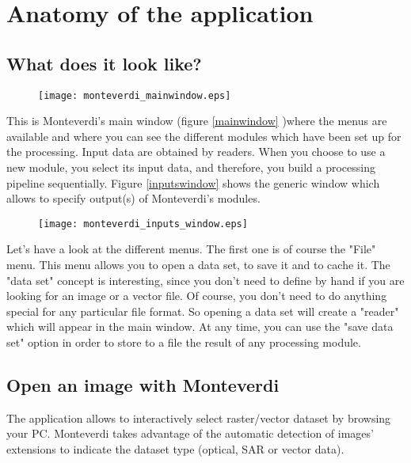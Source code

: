 \documentclass{InsightSoftwareGuide}
\begin{document}
 
\chapter{Anatomy of the application}
\section{What does it look like?}

\begin{figure}
   \center
   \texttt{[image: monteverdi\_mainwindow.eps]}
   \label{fig:mainwindow}
\end{figure}

This is Monteverdi's main window (figure \ref{mainwindow} )where the menus are available and where you can see the different 
modules which have been 
set up for the processing. Input data are obtained by readers. When you choose to use a new module, you select its input data,
 and therefore, you build a processing pipeline sequentially. 
Figure \ref{inputswindow} shows the generic window which allows to specify output(s) of Monteverdi's modules. 
 
\begin{figure}
   \center
   \texttt{[image: monteverdi\_inputs\_window.eps]}
   \label{fig:inputswindow}
\end{figure}
Let's have a look at the different menus. The first one is of
 course the "File" menu. This menu allows you to open a data set, to save it and to cache it. The "data set" concept is
 interesting, since you don't need to define by hand if you are looking for an image or a vector file. Of course, 
you don't need to do anything special for any particular file format. So opening a data set will create a "reader" 
which will appear in the main window. At any time, you can use the "save data set" option in order to store to a 
file the result of any processing module.




\section{Open an image with Monteverdi}
The application allows to interactively select raster/vector dataset by browsing your PC. Monteverdi takes
advantage of the automatic detection of images' extensions to indicate the dataset type (optical, SAR or vector data).   
\end{document}
